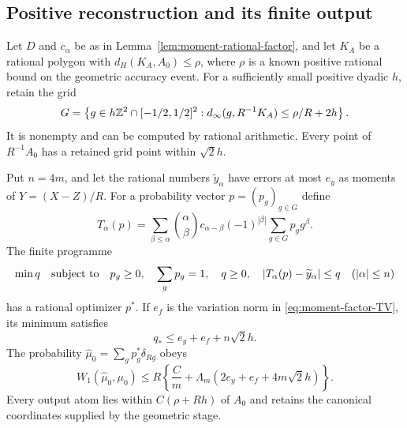 \subsection{Positive reconstruction and its finite output}
\begin{lemma}
\label{lem:moment-positive-programme}
Let $D$ and $c_\alpha$ be as in
Lemma~\ref{lem:moment-rational-factor}, and let $K_A$ be a rational
polygon with $d_H(K_A,A_0)\le\rho$, where $\rho$ is a known
positive rational bound on the geometric accuracy event.  For a
sufficiently small positive dyadic $h$, retain the grid
\begin{equation}\label{eq:moment-padded-grid}
 G=\left\{g\in h\mathbb Z^2\cap[-1/2,1/2]^2:
   d_\infty(g,R^{-1}K_A)\le\rho/R+2h\right\}.
\end{equation}
It is nonempty and can be computed by rational arithmetic.  Every
point of $R^{-1}A_0$ has a retained grid point within $\sqrt2h$.

Put $n=4m$, and let the rational numbers $\widetilde y_\alpha$
have errors at most $e_y$ as moments of $Y=(X-Z)/R$.  For a
probability vector $p=(p_g)_{g\in G}$ define
\begin{equation}\label{eq:moment-positive-convolution}
 T_\alpha(p)=\sum_{\beta\le\alpha}\binom\alpha\beta
     c_{\alpha-\beta}(-1)^{|\beta|}
                              \sum_{g\in G}p_g g^\beta.
\end{equation}
The finite programme
\begin{equation}\label{eq:moment-positive-LP}
 \min q\quad\hbox{subject to}\quad
 p_g\ge0,\quad\sum_gp_g=1,\quad q\ge0,\quad
 |T_\alpha(p)-\widetilde y_\alpha|\le q
                                      \quad(|\alpha|\le n)
\end{equation}
has a rational optimizer $p^*$.  If $e_f$ is the variation norm in
\eqref{eq:moment-factor-TV}, its minimum satisfies
\begin{equation}\label{eq:moment-feasible-residual}
 q_*\le e_y+e_f+n\sqrt2h.
\end{equation}
The probability $\widehat\mu_0=\sum_gp_g^*\delta_{Rg}$ obeys
\begin{equation}\label{eq:moment-positive-output-bound}
 W_1(\widehat\mu_0,\mu_0)
 \le R\left\{\frac{C}{m}
            +\Lambda_m(2e_y+e_f+4m\sqrt2h)\right\}.
\end{equation}
Every output atom lies within $C(\rho+Rh)$ of $A_0$ and retains
the canonical coordinates supplied by the geometric stage.
\end{lemma}
